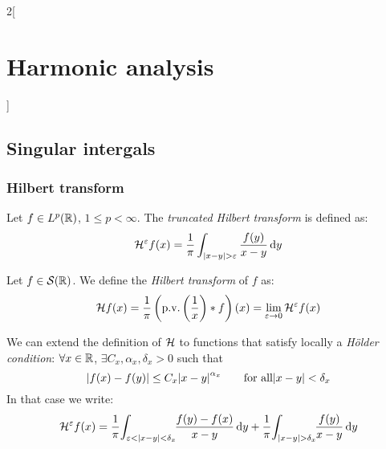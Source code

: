 \documentclass[../../../main_math.tex]{subfiles}
\begin{document}
\begin{multicols}{2}[\section{Harmonic analysis}]
  \subsection{Singular intergals}
  \subsubsection{Hilbert transform}
  \begin{definition}
    Let $f\in L^p(\mathbb{R})$, $1\leq p<\infty$. The \emph{truncated Hilbert transform} is defined as:
    $$
      \mathcal{H}^\varepsilon f(x)=\frac{1}{\pi}\int_{\abs{x-y}>\varepsilon}\frac{f(y)}{x-y}\dd{y}
    $$
  \end{definition}
  \begin{definition}
    Let $f\in \mathcal{S}(\mathbb{R})$. We define the \emph{Hilbert transform} of $f$ as:
    $$
      \mathcal{H} f(x)=\frac{1}{\pi}\left(\mathrm{p.v.}\left(\frac{1}{x}\right)*f\right)(x)=\lim_{\varepsilon\to 0} \mathcal{H}^\varepsilon f(x)
    $$
  \end{definition}
  \begin{remark}
    We can extend the definition of $\mathcal{H}$ to functions that satisfy locally a \emph{Hölder condition}: $\forall x\in\mathbb{R}$, $\exists C_x,\alpha_x,\delta_x>0$ such that $$\abs{f(x)-f(y)}\leq C_x\abs{x-y}^{\alpha_x}\qquad\text{for all}\abs{x-y}<\delta_x$$
    In that case we write:
    $$
      \mathcal{H}^\varepsilon f(x)=\frac{1}{\pi}\!\int_{\varepsilon<\abs{x-y}<\delta_x}\!\!\frac{f(y)-f(x)}{x-y}\dd{y} + \frac{1}{\pi}\!\int_{\abs{x-y}>\delta_x}\!\!\frac{f(y)}{x-y}\dd{y}
    $$


\end{remark}
\end{multicols}
\end{document}
